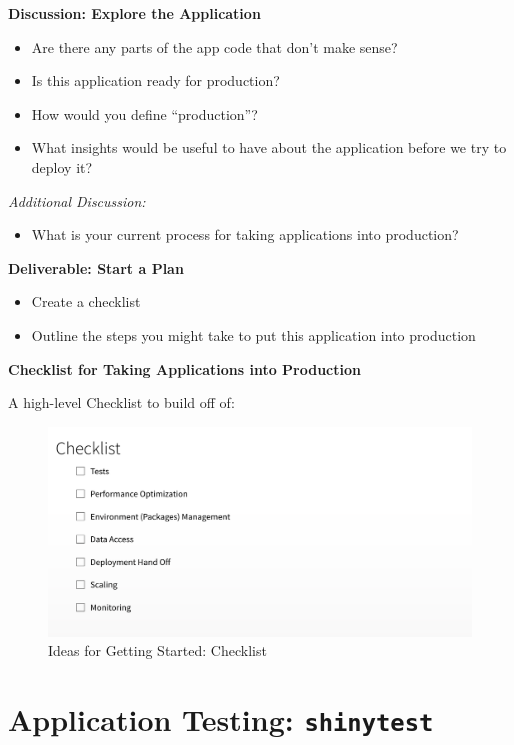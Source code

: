 \documentclass[]{book}
\providecommand{\tightlist}{%
  \setlength{\itemsep}{0pt}\setlength{\parskip}{0pt}}
\theoremstyle{definition}
\theoremstyle{definition}
\theoremstyle{definition}
\theoremstyle{remark}
\begin{document}
\textbf{Discussion: Explore the Application}

\begin{itemize}
\tightlist
\item
  Are there any parts of the app code that don't make sense?
\item
  Is this application ready for production?
\item
  How would you define ``production''?
\item
  What insights would be useful to have about the application before we
  try to deploy it?
\end{itemize}

\emph{Additional Discussion:}

\begin{itemize}
\tightlist
\item
  What is your current process for taking applications into production?
\end{itemize}

\textbf{Deliverable: Start a Plan}

\begin{itemize}
\tightlist
\item
  Create a checklist
\item
  Outline the steps you might take to put this application into
  production
\end{itemize}

\textbf{Checklist for Taking Applications into Production}

A high-level Checklist to build off of:

\begin{figure}
\centering
\includegraphics{imgs/app-intro/skeleton-checklist.png}
\caption{Ideas for Getting Started: Checklist}
\end{figure}

\hypertarget{application-testing-shinytest}{%
\chapter{\texorpdfstring{Application Testing:
\texttt{shinytest}}{Application Testing: shinytest}}\label{application-testing-shinytest}}
\end{document}
